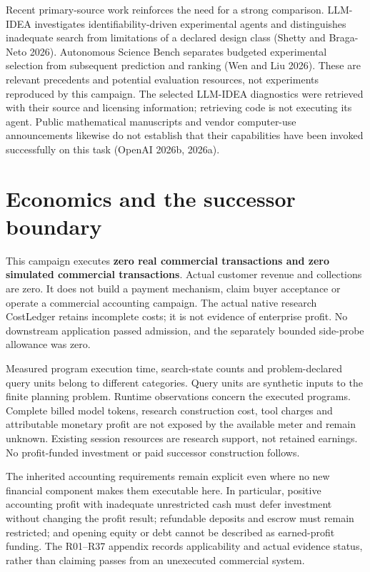\documentclass[10pt,letterpaper]{article}
\begin{document}
Recent primary-source work reinforces the need for a strong comparison.
LLM-IDEA investigates identifiability-driven experimental agents and
distinguishes inadequate search from limitations of a declared design
class (Shetty and Braga-Neto 2026). Autonomous Science Bench separates
budgeted experimental selection from subsequent prediction and ranking
(Wen and Liu 2026). These are relevant precedents and potential
evaluation resources, not experiments reproduced by this campaign. The
selected LLM-IDEA diagnostics were retrieved with their source and
licensing information; retrieving code is not executing its agent.
Public mathematical manuscripts and vendor computer-use announcements
likewise do not establish that their capabilities have been invoked
successfully on this task (OpenAI 2026b, 2026a).

\hypertarget{economics-and-the-successor-boundary}{%
\section{Economics and the successor
boundary}\label{economics-and-the-successor-boundary}}

This campaign executes \textbf{zero real commercial transactions and
zero simulated commercial transactions}. Actual customer revenue and
collections are zero. It does not build a payment mechanism, claim buyer
acceptance or operate a commercial accounting campaign. The actual
native research CostLedger retains incomplete costs; it is not evidence
of enterprise profit. No downstream application passed admission, and
the separately bounded side-probe allowance was zero.

Measured program execution time, search-state counts and
problem-declared query units belong to different categories. Query units
are synthetic inputs to the finite planning problem. Runtime
observations concern the executed programs. Complete billed model
tokens, research construction cost, tool charges and attributable
monetary profit are not exposed by the available meter and remain
unknown. Existing session resources are research support, not retained
earnings. No profit-funded investment or paid successor construction
follows.

The inherited accounting requirements remain explicit even where no new
financial component makes them executable here. In particular, positive
accounting profit with inadequate unrestricted cash must defer
investment without changing the profit result; refundable deposits and
escrow must remain restricted; and opening equity or debt cannot be
described as earned-profit funding. The R01--R37 appendix records
applicability and actual evidence status, rather than claiming passes
from an unexecuted commercial system.
\end{document}
